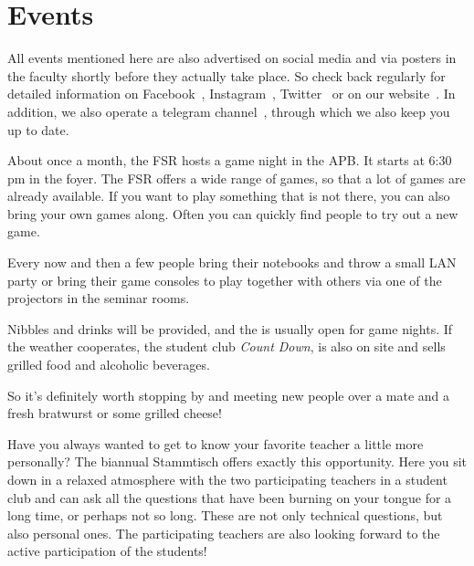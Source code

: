 \chapter{Events}
\label{cha:veranstaltungen}

All events mentioned here are also advertised on social media and via posters in the faculty shortly before they actually take place. So check back regularly for detailed information on
Facebook~,
Instagram~,
Twitter~ or on our
website~. 
In addition, we also operate a telegram channel~, through which we also keep you up to date.


About once a month, the FSR hosts a game night in the APB. It starts at 6:30 pm in the foyer. 
The FSR offers a wide range of games, so that a lot of games are already available. 
If you want to play something that is not there, you can also bring your own games along. Often you can quickly find people to try out a new game.

Every now and then a few people bring their notebooks and throw a small LAN party or bring their game consoles to play together with others via one of the projectors in the seminar rooms.

Nibbles and drinks will be provided, and the \ascii{} is usually open for game nights. 
If the weather cooperates, the student club \emph{Count Down}, is also on site and sells grilled food and alcoholic beverages.

So it's definitely worth stopping by and meeting new people over a mate and a fresh bratwurst or some grilled cheese!




Have you always wanted to get to know your favorite teacher a little more personally? The biannual Stammtisch offers exactly this opportunity. Here you sit down in a relaxed atmosphere with the two participating teachers in a student club and can ask all the questions that have been burning on your tongue for a long time, or perhaps not so long. These are not only technical questions, but also personal ones. The participating teachers are also looking forward to the active participation of the students!

